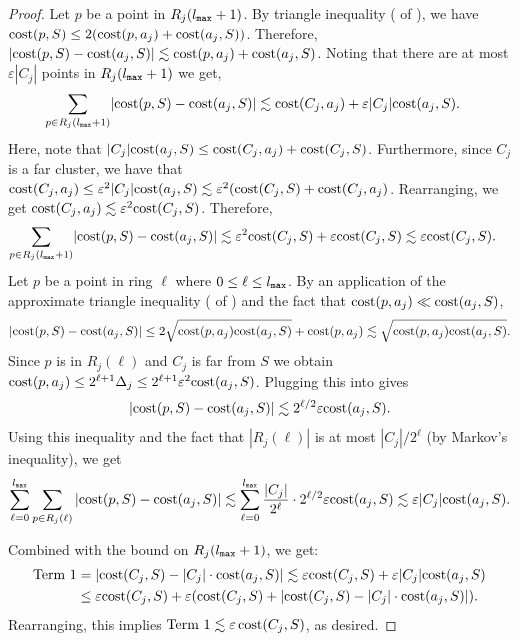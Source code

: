 \documentclass[11pt]{article}
\theoremstyle{restate}
\theoremstyle{definition}
\newcommand{\eps}{\ensuremath{\varepsilon}}
\newcommand{\cost}{\textnormal{cost}}
\newcommand{\lmax}{l_\ensuremath{\textnormal{\texttt{max}}}}
\begin{document}
\begin{proof}
Let $p$ be a point in $R_j(\lmax +1)$. By triangle inequality ( of ), we have  $\cost(p,S) \leq 2(\cost(p,a_j) + \cost(a_j,S))$. Therefore, $|\cost(p,S) - \cost(a_j,S)| \lesssim \cost(p,a_j) + \cost(a_j,S)$. Noting that there are at most $\eps |C_j|$ points in $R_j(\lmax + 1)$ we get,
\begin{align*}
     \sum_{p \in R_j(\lmax +1)} &|\cost(p,S) - \cost(a_j,S)| \lesssim \cost(C_j,a_j) + \eps |C_j| \cost(a_j,S).
\end{align*}
Here, note that $|C_j|\cost(a_j, S) \leq \cost(C_j, a_j) + \cost(C_j, S)$. Furthermore, 
since $C_j$ is a far cluster, we have that $\cost(C_j, a_j) \leq \eps^2 |C_j| \cost(a_j, S) \lesssim \eps^2 (\cost(C_j, S) + \cost(C_j, a_j)$. Rearranging, we get $\cost(C_j, a_j) \lesssim \eps^2 \cost(C_j, S)$. Therefore, 
\begin{align*}
     \sum_{p \in R_j(\lmax +1)} &|\cost(p,S) - \cost(a_j,S)|\lesssim \eps^2 \cost(C_j,S) + \eps \cost(C_j,S) \lesssim \eps \cost(C_j,S).
\end{align*}
Let $p$ be a point in ring $\ell$ where $0 \leq \ell \leq \lmax$. By an application of the approximate triangle inequality  ( of ) and the fact that $\cost(p, a_j) \ll \cost(a_j, S)$,
\begin{align}\label{eq: reuse-2}
|\cost(p,S) - \cost(a_j,S)| \leq 2 \sqrt{ \cost(p,a_j)\cost(a_j,S)} + \cost(p,a_j) 
\lesssim  \sqrt{\cost(p,a_j)\cost(a_j,S)}.
\end{align}
Since $p$ is in $R_j(\ell)$ and $C_j$ is far from $S$ we obtain $\cost(p,a_j) \leq 2^{\ell+1} \Delta_j \leq 2^{\ell+1} \eps^{2} \cost(a_j,S)$. Plugging this into   gives 
\begin{align}
\label{eq: reuse-3}
|\cost(p,S) - \cost(a_j,S)| \lesssim 2^{\ell/2} \eps \cost(a_j,S).
\end{align}
Using this inequality and the fact that $|R_j(\ell)|$ is at most $|C_j|/2^{\ell}$ (by Markov's inequality), we get
\begin{align*}
    \sum_{\ell = 0}^{\lmax}\sum_{p \in R_j(\ell)} |\cost(p,S) - \cost(a_j,S)| \lesssim \sum_{\ell = 0}^{\lmax} \frac{|C_j|}{2^\ell} \cdot 2^{\ell/2} \eps \cost(a_j,S)
    \lesssim \eps|C_j| \cost(a_j,S). 
\end{align*}

Combined with the bound on $R_j(\lmax+1)$, we get:
\begin{align}
\notag
    \text{Term 1} &= |\cost(C_j,S) - |C_j| \cdot \cost(a_j,S)| \lesssim \eps \cost(C_j,S) + \eps|C_j| \cost(a_j,S)\\ 
    \label{eq:term1}
    &\leq \eps \cost(C_j, S) + \eps (\cost(C_j, S) + |\cost(C_j,S) - |C_j| \cdot \cost(a_j,S)|).
\end{align}
Rearranging, this implies $\text{Term 1} \lesssim \eps \,\cost(C_j, S)$, as desired.

\end{proof}
\end{document}
